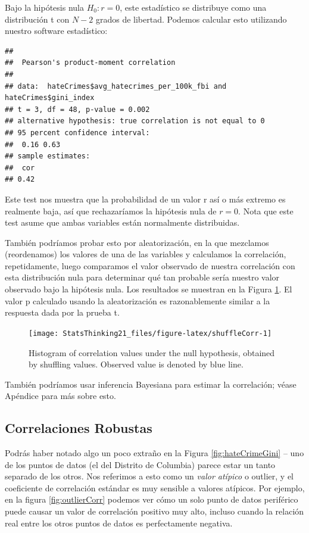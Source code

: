 \documentclass[
  12pt,
]{book}
\begin{document}
Bajo la hipótesis nula \(H_0:r=0\), este estadístico se distribuye como una distribución t con \(N - 2\) grados de libertad. Podemos calcular esto utilizando nuestro software estadístico:

\begin{verbatim}
## 
##  Pearson's product-moment correlation
## 
## data:  hateCrimes$avg_hatecrimes_per_100k_fbi and hateCrimes$gini_index
## t = 3, df = 48, p-value = 0.002
## alternative hypothesis: true correlation is not equal to 0
## 95 percent confidence interval:
##  0.16 0.63
## sample estimates:
##  cor 
## 0.42
\end{verbatim}

Este test nos muestra que la probabilidad de un valor r así o más extremo es realmente baja, así que rechazaríamos la hipótesis nula de \(r=0\). Nota que este test asume que ambas variables están normalmente distribuidas.

También podríamos probar esto por aleatorización, en la que mezclamos (reordenamos) los valores de una de las variables y calculamos la correlación, repetidamente, luego comparamos el valor observado de nuestra correlación con esta distribución nula para determinar qué tan probable sería nuestro valor observado bajo la hipótesis nula. Los resultados se muestran en la Figura \ref{fig:shuffleCorr}. El valor p calculado usando la aleatorización es razonablemente similar a la respuesta dada por la prueba t.

\begin{figure}
\texttt{[image: StatsThinking21\_files/figure-latex/shuffleCorr-1]} \caption{Histogram of correlation values under the null hypothesis, obtained by shuffling values. Observed value is denoted by blue line.}\label{fig:shuffleCorr}
\end{figure}

También podríamos usar inferencia Bayesiana para estimar la correlación; véase Apéndice para más sobre esto.

\hypertarget{robust-correlations}{%
\subsection{Correlaciones Robustas}\label{robust-correlations}}

Podrás haber notado algo un poco extraño en la Figura \ref{fig:hateCrimeGini} -- uno de los puntos de datos (el del Distrito de Columbia) parece estar un tanto separado de los otros. Nos referimos a esto como un \emph{valor atípico} o outlier, y el coeficiente de correlación estándar es muy sensible a valores atípicos. Por ejemplo, en la figura \ref{fig:outlierCorr} podemos ver cómo un solo punto de datos periférico puede causar un valor de correlación positivo muy alto, incluso cuando la relación real entre los otros puntos de datos es perfectamente negativa.
\end{document}
